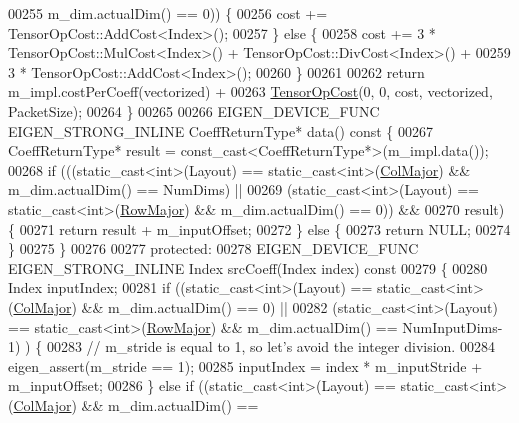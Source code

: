 \begin{DoxyCode}
00255                 m\_dim.actualDim() == 0)) \{
00256       cost += TensorOpCost::AddCost<Index>();
00257     \} \textcolor{keywordflow}{else} \{
00258       cost += 3 * TensorOpCost::MulCost<Index>() + TensorOpCost::DivCost<Index>() +
00259               3 * TensorOpCost::AddCost<Index>();
00260     \}
00261 
00262     \textcolor{keywordflow}{return} m\_impl.costPerCoeff(vectorized) +
00263            \hyperlink{class_eigen_1_1_tensor_op_cost}{TensorOpCost}(0, 0, cost, vectorized, PacketSize);
00264   \}
00265 
00266   EIGEN\_DEVICE\_FUNC EIGEN\_STRONG\_INLINE CoeffReturnType* data()\textcolor{keyword}{ const }\{
00267     CoeffReturnType* result = \textcolor{keyword}{const\_cast<}CoeffReturnType*\textcolor{keyword}{>}(m\_impl.data());
00268     \textcolor{keywordflow}{if} (((static\_cast<int>(Layout) == static\_cast<int>(\hyperlink{group__enums_ggaacded1a18ae58b0f554751f6cdf9eb13a0cbd4bdd0abcfc0224c5fcb5e4f6669a}{ColMajor}) && m\_dim.actualDim() == NumDims) 
      ||
00269          (static\_cast<int>(Layout) == \textcolor{keyword}{static\_cast<}\textcolor{keywordtype}{int}\textcolor{keyword}{>}(\hyperlink{group__enums_ggaacded1a18ae58b0f554751f6cdf9eb13acfcde9cd8677c5f7caf6bd603666aae3}{RowMajor}) && m\_dim.actualDim() == 0)) &&
00270         result) \{
00271       \textcolor{keywordflow}{return} result + m\_inputOffset;
00272     \} \textcolor{keywordflow}{else} \{
00273       \textcolor{keywordflow}{return} NULL;
00274     \}
00275   \}
00276 
00277  \textcolor{keyword}{protected}:
00278   EIGEN\_DEVICE\_FUNC EIGEN\_STRONG\_INLINE Index srcCoeff(Index index)\textcolor{keyword}{ const}
00279 \textcolor{keyword}{  }\{
00280     Index inputIndex;
00281     \textcolor{keywordflow}{if} ((static\_cast<int>(Layout) == static\_cast<int>(\hyperlink{group__enums_ggaacded1a18ae58b0f554751f6cdf9eb13a0cbd4bdd0abcfc0224c5fcb5e4f6669a}{ColMajor}) && m\_dim.actualDim() == 0) ||
00282     (static\_cast<int>(Layout) == \textcolor{keyword}{static\_cast<}\textcolor{keywordtype}{int}\textcolor{keyword}{>}(\hyperlink{group__enums_ggaacded1a18ae58b0f554751f6cdf9eb13acfcde9cd8677c5f7caf6bd603666aae3}{RowMajor}) && m\_dim.actualDim() == NumInputDims-1)
      ) \{
00283       \textcolor{comment}{// m\_stride is equal to 1, so let's avoid the integer division.}
00284       eigen\_assert(m\_stride == 1);
00285       inputIndex = index * m\_inputStride + m\_inputOffset;
00286     \} \textcolor{keywordflow}{else} \textcolor{keywordflow}{if} ((static\_cast<int>(Layout) == static\_cast<int>(\hyperlink{group__enums_ggaacded1a18ae58b0f554751f6cdf9eb13a0cbd4bdd0abcfc0224c5fcb5e4f6669a}{ColMajor}) && m\_dim.actualDim() == 

\end{DoxyCode}

